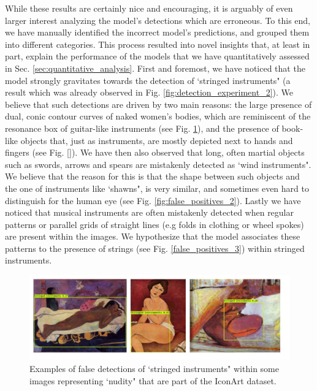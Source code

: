 While these results are certainly nice and encouraging, it is arguably of even larger interest analyzing the model's detections which are erroneous. To this end, we have manually identified the incorrect model's predictions, and grouped them into different categories. This process resulted into novel insights that, at least in part, explain the performance of the models that we have quantitatively assessed in Sec. \ref{sec:quantitative_analysis}.
First and foremost, we have noticed that the model strongly gravitates towards the detection of `stringed instruments" (a result which was already observed in Fig. \ref{fig:detection_experiment_2}). We believe that such detections are driven by two main reasons: the large presence of dual, conic contour curves of naked women's bodies, which are reminiscent of the resonance box of guitar-like instruments (see Fig. \ref{fig:false_positives_1}), and the presence of book-like objects that, just as instruments, are mostly depicted next to hands and fingers (see Fig. \ref{}). 
We have then also observed that long, often martial objects such as swords, arrows and spears are mistakenly detected as `wind instruments". We believe that the reason for this is that the shape between such objects and the one of instruments like `shawns", is very similar, and sometimes even hard to distinguish for the human eye (see Fig. \ref{fig:false_positives_2}).
Lastly we have noticed that musical instruments are often mistakenly detected when regular patterns or parallel grids of straight lines (e.g folds in clothing or wheel spokes) are present within the images. We hypothesize that the model associates these patterns to the presence of strings (see Fig. \ref{false_positives_3}) within stringed instruments. 

\begin{figure}[ht!]
\centering
  \includegraphics[width=\linewidth]{./Images/Chapter05/false_positives_1}
  \caption{Examples of false detections of `stringed instruments" within some images representing `nudity" that are part of the IconArt dataset.}
  \label{fig:false_positives_1}
\end{figure}


